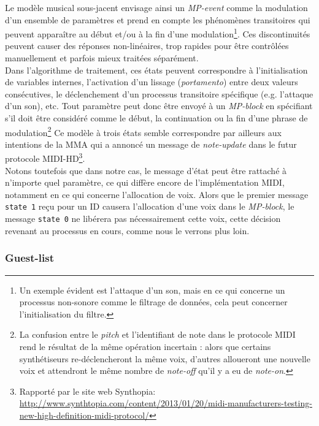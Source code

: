 \noindent Le modèle musical sous-jacent envisage ainsi un \textit{MP-event} comme la modulation d'un ensemble de paramètres et prend en compte les phénomènes transitoires qui peuvent apparaître au début et/ou à la fin d'une modulation\footnote{ Un exemple évident est l'attaque d'un son, mais en ce qui concerne un processus non-sonore comme le filtrage de données, cela peut concerner l'initialisation du filtre.}. Ces discontinuités peuvent causer des réponses non-linéaires, trop rapides pour être contrôlées manuellement et parfois mieux traitées séparément.\\
\indent Dans l'algorithme de traitement, ces états peuvent correspondre à l'initialisation de variables internes, l'activation d'un lissage (\textit{portamento}) entre deux valeurs consécutives, le déclenchement d'un processus transitoire spécifique (e.g. l'attaque d'un son), etc. Tout paramètre peut donc être envoyé à un \textit{MP-block} en spécifiant s'il doit être considéré comme le début, la continuation ou la fin d'une phrase de modulation\footnote{ La confusion entre le \textit{pitch} et l'identifiant de note dans le protocole \gls{MIDI} rend le résultat de la même opération incertain : alors que certains synthétiseurs re-déclencheront la même voix, d'autres alloueront une nouvelle voix et attendront le même nombre de \textit{note-off} qu'il y a eu de \textit{note-on}.} Ce modèle à trois états semble correspondre par ailleurs aux intentions de la \gls{MMA} qui a annoncé un message de \textit{note-update} dans le futur protocole MIDI-HD\footnote{Rapporté par le site web Synthopia: \url{http://www.synthtopia.com/content/2013/01/20/midi-manufacturers-testing-new-high-definition-midi-protocol/}}.\\
\indent Notons toutefois que dans notre cas, le message d'état peut être rattaché à n'importe quel paramètre, ce qui diffère encore de l'implémentation \gls{MIDI}, notamment en ce qui concerne l'allocation de voix. Alors que le premier message \verb|state 1| reçu pour un ID causera l'allocation d'une voix dans le \textit{MP-block}, le message \verb|state 0| ne libérera pas nécessairement cette voix, cette décision revenant au processus en cours, comme nous le verrons plus loin.

\subsubsection{Guest-list}

